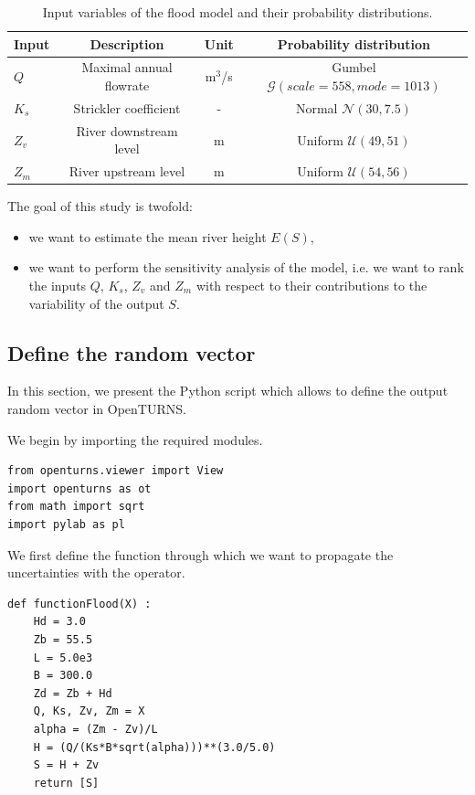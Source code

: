 \documentclass{article}
\begin{document}
\begin{table}[!ht]
  \begin{center}
   \begin{tabular}{lccc}
Input & Description & Unit & Probability distribution \\
   \hline
 $Q$ & Maximal annual flowrate & m$^3$/s & Gumbel ${\mathcal G}(scale = 558, mode = 1013)$ \\
 $K_s$ & Strickler coefficient & - & Normal ${\mathcal N}(30, 7.5)$  \\
 $Z_v$ & River downstream level & m & Uniform  ${\mathcal U}(49, 51)$ \\
 $Z_m$ & River upstream level  & m  & Uniform  ${\mathcal U}(54, 56)$\\
\hline
    \end{tabular}
    \caption{Input variables of the flood model and their probability distributions.}
    \label{tab:factors}
  \end{center}
\end{table}

The goal of this study is twofold:
\begin{itemize}
\item we want to estimate the mean river height $E(S)$, 
\item we want to perform the sensitivity analysis of the model, i.e. 
we want to rank the inputs $Q$, $K_s$, $Z_v$ and $Z_m$ with respect to their contributions 
to the variability of the output $S$.
\end{itemize}


\subsection{Define the random vector}

In this section, we present the Python script which allows to define the 
output random vector in OpenTURNS. 

We begin by importing the required modules.
\lstset{language=Python}
\begin{lstlisting}
from openturns.viewer import View
import openturns as ot
from math import sqrt
import pylab as pl
\end{lstlisting}


We first define the function through which we want to propagate the 
uncertainties with the  operator.

\lstset{language=Python}
\begin{lstlisting}
def functionFlood(X) :
    Hd = 3.0
    Zb = 55.5
    L = 5.0e3
    B = 300.0
    Zd = Zb + Hd
    Q, Ks, Zv, Zm = X
    alpha = (Zm - Zv)/L
    H = (Q/(Ks*B*sqrt(alpha)))**(3.0/5.0)
    S = H + Zv
    return [S]
\end{lstlisting}
\end{document}
